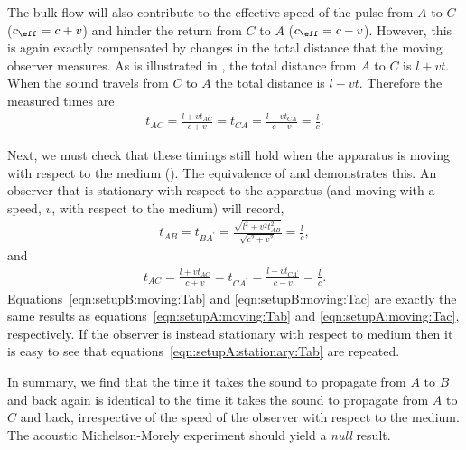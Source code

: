 The bulk flow will also contribute to the effective speed of the pulse from $A$ to $C$  ($c_\eff = c+v$) 
and hinder  the return from $C$ to $A$ ($c_\eff = c-v$).
However, this is again exactly compensated by changes in the total distance that the moving observer measures.
As is illustrated in , the total distance from $A$ to $C$ is $l+vt$. %
When the sound travels from $C$ to $A$ the total  distance is $l-vt$. %
%
Therefore the measured times are
\begin{align}
  \label{eqn:setupA:moving:Tac}
  t_{AC} =  \frac{l+vt_{AC}}{c+v}= t_{CA} =  \frac{l-vt_{CA}}{c-v}= \frac{l}{c}.
\end{align}

Next, we must check that these timings still hold when the apparatus is moving with respect to the medium ().
The equivalence of  and  demonstrates this.
An observer that is stationary with respect to the apparatus (and moving with a speed, $v$, with respect to the medium) will record,
\begin{align}
  \label{eqn:setupB:moving:Tab}
  t_{AB} = t_{BA^\prime} =  \frac{\sqrt{l^2+v^2t_{AB}^2}}{\sqrt{c^2 +v^2}} = \frac{l}{c},
\end{align}
and 
\begin{align}
  \label{eqn:setupB:moving:Tac}
  t_{AC} =  \frac{l+vt_{AC}}{c+v}= t_{CA^\prime} =  \frac{l-vt_{CA^\prime}}{c-v}= \frac{l}{c}.
\end{align}
Equations~\ref{eqn:setupB:moving:Tab} and \ref{eqn:setupB:moving:Tac}  are exactly the same results as equations~\ref{eqn:setupA:moving:Tab} and \ref{eqn:setupA:moving:Tac},
respectively.
If the observer is instead stationary with respect to medium then it is easy to see that equations~\ref{eqn:setupA:stationary:Tab}  are repeated.

In summary, we find that the time it takes the sound to propagate from $A$ to $B$ and back again is
identical to the time it takes the sound to propagate from $A$ to $C$ and back,
irrespective of the speed of the observer with respect to the medium.
The acoustic Michelson-Morely experiment should yield a  {\em null} result.

